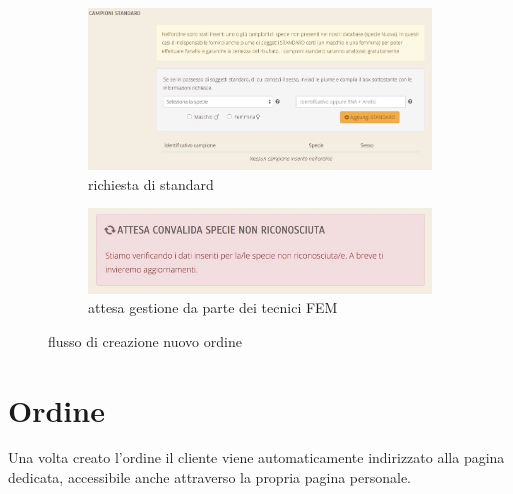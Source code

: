 \begin{figure}
 \begin{subfigure}[b]{0.6\textwidth}
   \includegraphics[width=\textwidth]{images/cl-nuovo-ordine-r-standard} 
   \caption{richiesta di standard}
   \label{fig:cl-nuovo-ordine-r-standard}
 \end{subfigure}
 \begin{subfigure}[b]{0.45\textwidth}
   \includegraphics[width=\textwidth]{images/cl-nuovo-ordine-attesa}
   \caption{attesa gestione da parte dei tecnici FEM}
   \label{fig:cl-nuovo-ordine-attesa} 
 \end{subfigure}
 \caption{flusso di creazione nuovo ordine}
\end{figure}

\section*{Ordine}
Una volta creato l'ordine il cliente viene automaticamente indirizzato alla pagina dedicata, accessibile anche attraverso la propria pagina personale.

